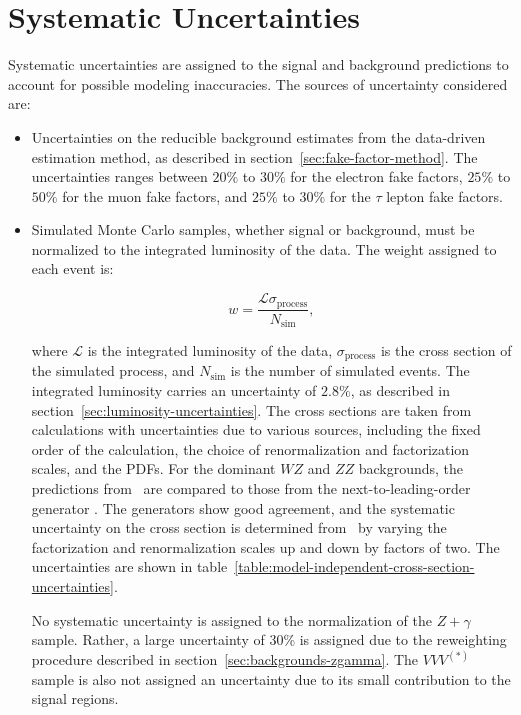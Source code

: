 \section{Systematic Uncertainties}\label{sec:model-independent-systematics}
Systematic uncertainties are assigned to the signal and background predictions to account for possible modeling inaccuracies. The sources of uncertainty considered are:

\begin{itemize}
	\item Uncertainties on the reducible background estimates from the data-driven estimation method, as described in section~\ref{sec:fake-factor-method}. The uncertainties ranges between $20\%$ to $30\%$ for the electron fake factors, $25\%$ to $50\%$ for the muon fake factors, and $25\%$ to $30\%$ for the $\tau$ lepton fake factors.

  \item  Simulated Monte Carlo samples, whether signal or background, must be normalized to the integrated luminosity of the data. The weight assigned to each event is:
  
  \begin{equation}
   w = \frac{\mathcal{L} \sigma_{\mathrm{process}}}{N_{\mathrm{sim}}},
  \end{equation}
  
  where $\mathcal{L}$ is the integrated luminosity of the data, $\sigma_{\mathrm{process}}$ is the cross section of the simulated process, and $N_{\mathrm{sim}}$ is the number of simulated events. The integrated luminosity carries an uncertainty of $2.8\%$, as described in section~\ref{sec:luminosity-uncertainties}. The cross sections are taken from calculations with uncertainties due to various sources, including the fixed order of the calculation, the choice of renormalization and factorization scales, and the PDFs. For the dominant $WZ$ and $ZZ$ backgrounds, the predictions from \sherpa\ are compared to those from the next-to-leading-order generator \vbfnlo. The generators show good agreement, and the systematic uncertainty on the cross section is determined from \vbfnlo\ by varying the factorization and renormalization scales up and down by factors of two. The uncertainties are shown in table~\ref{table:model-independent-cross-section-uncertainties}. 

  No systematic uncertainty is assigned to the normalization of the $Z+\gamma$ sample. Rather, a large uncertainty of 30\% is assigned due to the reweighting procedure described in section~\ref{sec:backgrounds-zgamma}. The $VVV^{(*)}$ sample is also not assigned an uncertainty due to its small contribution to the signal regions.
  

\end{itemize}
